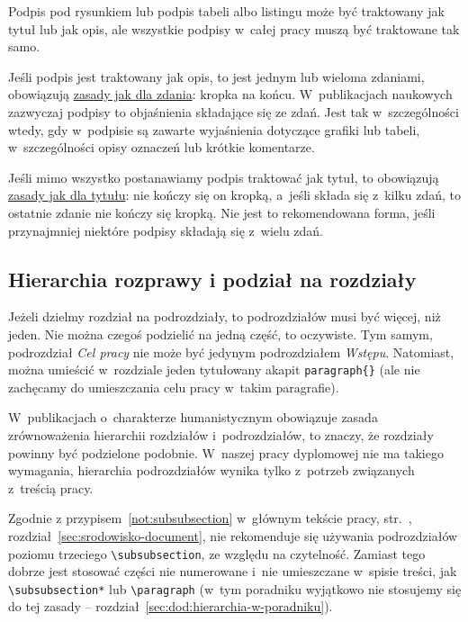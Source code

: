 Podpis pod rysunkiem lub podpis tabeli albo listingu może być traktowany jak tytuł lub jak opis, ale wszystkie podpisy w~całej pracy muszą być traktowane tak samo. 

Jeśli podpis jest traktowany jak opis, to jest jednym lub wieloma zdaniami, obowiązują \hyperref[sec:dod:zdaniem]{zasady jak dla zdania}: kropka na końcu. W~publikacjach naukowych zazwyczaj podpisy to objaśnienia składające się ze zdań. Jest tak w~szczególności wtedy, gdy w~podpisie są zawarte wyjaśnienia dotyczące grafiki lub tabeli, w~szczególności opisy oznaczeń lub krótkie komentarze.

Jeśli mimo wszystko postanawiamy podpis traktować jak tytuł, to obowiązują \hyperref[sec:dod:tytul]{zasady jak dla tytułu}: nie kończy się on kropką, a~jeśli składa się z~kilku zdań, to ostatnie zdanie nie kończy się kropką. Nie jest to rekomendowana forma, jeśli przynajmniej niektóre podpisy składają się z~wielu zdań.


\subsection{Hierarchia rozprawy i podział na rozdziały}
\label{sec:dod:hierarchia}
Jeżeli dzielmy rozdział na podrozdziały, to podrozdziałów musi być więcej, niż jeden. Nie można czegoś podzielić na jedną część, to oczywiste. Tym samym, podrozdział {\em Cel pracy} nie może być jedynym podrozdziałem {\em Wstępu}. Natomiast, można umieścić w~rozdziale jeden tytułowany akapit {\tt \bs{}paragraph\{\}} (ale nie zachęcamy do umieszczania celu pracy w~takim paragrafie).

W~publikacjach o~charakterze humanistycznym obowiązuje zasada zrównoważenia hierarchii rozdziałów i~podrozdziałów, to znaczy, że rozdziały powinny być podzielone podobnie. W~naszej pracy dyplomowej nie ma takiego wymagania, hierarchia podrozdziałów wynika tylko z~potrzeb związanych z~treścią pracy.

Zgodnie z przypisem~\ref{not:subsubsection} w~głównym tekście pracy, str.~\pageref{not:subsubsection}, rozdział~\ref{sec:srodowisko-document}, nie rekomenduje się używania podrozdziałów poziomu trzeciego {\tt \textbackslash{}subsubsection}, ze względu na czytelność. Zamiast tego dobrze jest stosować części nie numerowane i~nie umieszczane w~spisie treści, jak {\tt \textbackslash{}subsubsection*} lub {\tt \textbackslash{}paragraph} (w~tym poradniku wyjątkowo nie stosujemy się do tej zasady -- rozdział~\ref{sec:dod:hierarchia-w-poradniku}).


